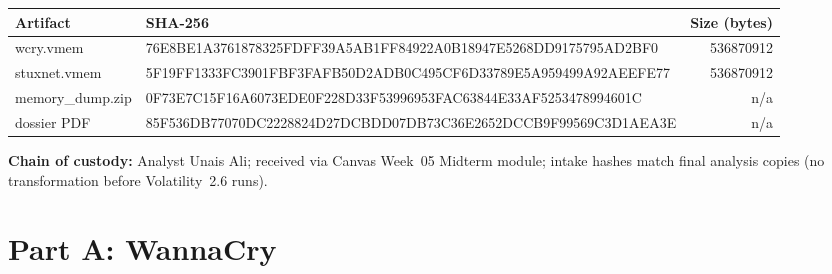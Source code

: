 \documentclass[11pt,letterpaper]{article}
\begin{document}
{\footnotesize
\begin{tabularx}{\textwidth}{@{}l >{\ttfamily\scriptsize}Y r@{}}
\toprule
\textbf{Artifact} & \textbf{SHA-256} & \textbf{Size (bytes)} \\
\midrule
wcry.vmem & 76E8BE1A3761878325FDFF39A5AB1FF84922A0B18947E5268DD9175795AD2BF0 & 536870912 \\
stuxnet.vmem & 5F19FF1333FC3901FBF3FAFB50D2ADB0C495CF6D33789E5A959499A92AEEFE77 & 536870912 \\
memory\_dump.zip & 0F73E7C15F16A6073EDE0F228D33F53996953FAC63844E33AF5253478994601C & n/a \\
dossier PDF & 85F536DB77070DC2228824D27DCBDD07DB73C36E2652DCCB9F99569C3D1AEA3E & n/a \\
\bottomrule
\end{tabularx}}

\noindent\textbf{Chain of custody:} Analyst Unais Ali; received via Canvas Week~05 Midterm module;
intake hashes match final analysis copies (no transformation before Volatility~2.6 runs).
\section*{Part A: WannaCry}
\end{document}
